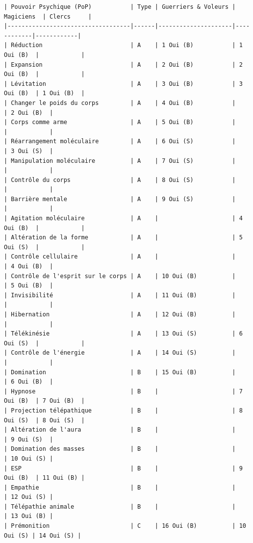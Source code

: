 \documentclass[12pt]{article}
\begin{document}
{\begin{verbatim}
| Pouvoir Psychique (PoP)           | Type | Guerriers & Voleurs | Magiciens  | Clercs     |
|-----------------------------------|------|---------------------|------------|------------|
| Réduction                         | A    | 1 Oui (B)           | 1 Oui (B)  |            |
| Expansion                         | A    | 2 Oui (B)           | 2 Oui (B)  |            |
| Lévitation                        | A    | 3 Oui (B)           | 3 Oui (B)  | 1 Oui (B)  |
| Changer le poids du corps         | A    | 4 Oui (B)           |            | 2 Oui (B)  |
| Corps comme arme                  | A    | 5 Oui (B)           |            |            |
| Réarrangement moléculaire         | A    | 6 Oui (S)           |            | 3 Oui (S)  |
| Manipulation moléculaire          | A    | 7 Oui (S)           |            |            |
| Contrôle du corps                 | A    | 8 Oui (S)           |            |            |
| Barrière mentale                  | A    | 9 Oui (S)           |            |            |
| Agitation moléculaire             | A    |                     | 4 Oui (B)  |            |
| Altération de la forme            | A    |                     | 5 Oui (S)  |            |
| Contrôle cellulaire               | A    |                     |            | 4 Oui (B)  |
| Contrôle de l'esprit sur le corps | A    | 10 Oui (B)          |            | 5 Oui (B)  |
| Invisibilité                      | A    | 11 Oui (B)          |            |            |
| Hibernation                       | A    | 12 Oui (B)          |            |            |
| Télékinésie                       | A    | 13 Oui (S)          | 6 Oui (S)  |            |
| Contrôle de l'énergie             | A    | 14 Oui (S)          |            |            |
| Domination                        | B    | 15 Oui (B)          |            | 6 Oui (B)  |
| Hypnose                           | B    |                     | 7 Oui (B)  | 7 Oui (B)  |
| Projection télépathique           | B    |                     | 8 Oui (S)  | 8 Oui (S)  |
| Altération de l'aura              | B    |                     |            | 9 Oui (S)  |
| Domination des masses             | B    |                     |            | 10 Oui (S) |
| ESP                               | B    |                     | 9 Oui (B)  | 11 Oui (B) |
| Empathie                          | B    |                     |            | 12 Oui (S) |
| Télépathie animale                | B    |                     |            | 13 Oui (B) |
| Prémonition                       | C    | 16 Oui (B)          | 10 Oui (S) | 14 Oui (S) |

\end{verbatim}}
\end{document}
